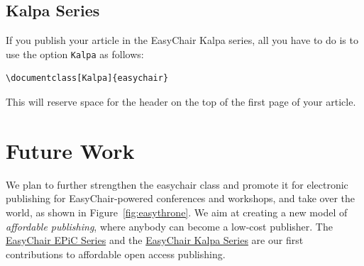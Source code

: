 \documentclass{easychair}
\newcommand{\easychair}{\textsf{easychair}}
\begin{document}
\subsection{Kalpa Series}
\label{subsec:Kalpa}

If you publish your article in the EasyChair Kalpa series, all you
have to do is to use the option \texttt{Kalpa} as follows:

\small
\begin{verbatim}
\documentclass[Kalpa]{easychair}
\end{verbatim}
\normalsize
This will reserve space for the header on the top of the first page of your
article. 


\section{Future Work}
\label{sect:future-work}

We plan to further strengthen the {\easychair} class and promote it for 
electronic publishing for EasyChair-powered conferences and workshops,
and take over the world, as shown in Figure~\ref{fig:easythrone}. We
aim at creating a new model of \emph{affordable publishing}, where
anybody can become a low-cost publisher. The
\href{http://www.easychair.org/publications/EPiC}{EasyChair EPiC
  Series} and
the
\href{http://www.easychair.org/publications/Kalpa}{EasyChair Kalpa Series} 
are our first contributions to affordable open access publishing.
\end{document}
